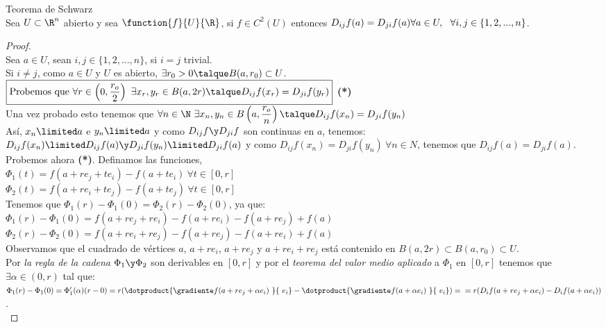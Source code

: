 	\begin{teor} Teorema de Schwarz\\
	Sea $U\subset\R^n$ abierto y sea $\function{f}{U}{\R}$, si $f\in C^2(U)$ entonces $D_{ij}f(a) = D_{ji}f(a)\\
	\forall a\in U,\ \ \forall i,j\in\{1,2,...,n\}$.
	\begin{proof}\ \\
	Sea $a\in U$, sean $i,j\in\{1,2,...,n\}$, si $i=j$ trivial.\\
	Si $i\neq j$, como $a\in U$ y $U$ es abierto, $\exists  r_0>0\talque B(a,r_0)\subset U$.\\
	$\boxed{\mathrm{Probemos\ que\ }\forall r\in\left(0,\dfrac{r_o}{2}\right)\ \exists x_r,y_r\in B(a,2r)\talque D_{ij}f(x_r)=D_{ji}f(y_r)}$ \textbf{(*)}\\
	Una vez probado esto tenemos que $\forall n\in \N\ \exists x_n,y_n \in B\left(a,\dfrac{r_o}{n}\right)\talque D_{ij}f(x_n)=D_{ji}f(y_n)$\\
	Así, $x_n\limited a$ e $y_n\limited a$ y como $D_{ij}f\y D_{ji}f$ son continuas en $a$, tenemos:\\
	$D_{ij}f(x_n)\limited D_{ij}f(a)\y D_{ji}f(y_n)\limited D_{ji}f(a)$ y como $D_{ij}f(x_n)=D_{ji}f(y_n)\ \forall n\in N$, tenemos que $D_{ij}f(a)=D_{ji}f(a)$.\\
	Probemos ahora \textbf{(*)}. Definamos las funciones,\\
	$\Phi_1(t)=f(a+r{e_j}+t{e_i})-f(a+t{e_i})\ \forall t\in [0,r]$\\
	$\Phi_2(t)=f(a+r{e_i}+t{e_j})-f(a+t{e_j})\ \forall t\in [0,r]$\\
	Tenemos que $\Phi_1(r)-\Phi_1(0)=\Phi_2(r)-\Phi_2(0)$, ya que:\\
	$\Phi_1(r)-\Phi_1(0)= f(a+re_j+re_i)-f(a+re_i)-f(a+re_j)+f(a)$\\
	$\Phi_2(r)-\Phi_2(0)= f(a+re_i+re_j)-f(a+re_j)-f(a+re_i)+f(a)$\\
	Observamos que el cuadrado de vértices $a$, $a +re_i$, $a+re_j$ y $a +re_i+re_j$ está contenido en $B(a,2r)\subset B(a,r_0)\subset U$.\\
	Por \textit{la regla de la cadena} $\Phi_1\y\Phi_2$ son derivables en $[0,r]$ y por el \textit{teorema del valor medio aplicado} a $\Phi_1$ en $[0,r]$ tenemos que $\exists\alpha\in(0,r)$ tal que:\\
	$\Phi_1(r)-\Phi_1(0)=\Phi_1'(\alpha)(r-0)=r(\dotproduct{\gradiente f(a+re_j+\alpha e_i)\ }{\ e_i}-\dotproduct{\gradiente f(a+\alpha e_i)\ }{\ e_i})=\\
	=r(D_if(a+re_j+\alpha e_i)-D_if(a+\alpha e_i))$.\\

\end{proof}
\end{teor}

